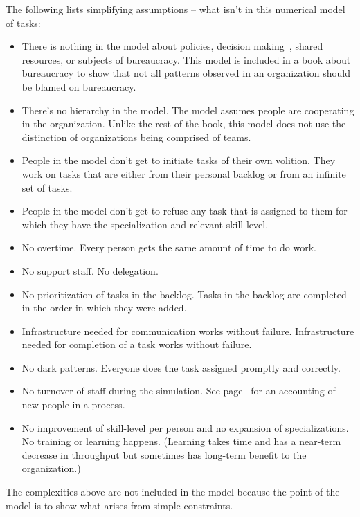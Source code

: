 The following lists simplifying assumptions -- what isn't in this numerical model of tasks:
\begin{itemize}
    \item There is nothing in the model about policies, decision making~\cite{2009_Klimek}, shared resources, or subjects of bureaucracy. This model is included in a book about bureaucracy to show that not all patterns observed in an organization should be blamed on bureaucracy. 
    \item There's no hierarchy in the model. The model assumes people are cooperating in the organization. Unlike the rest of the book, this model does not use the distinction of organizations being comprised of teams.
    \item People in the model don't get to initiate tasks of their own volition. They work on tasks that are either from their personal backlog or from an infinite set of tasks.
    \item People in the model don't get to refuse any task that is assigned to them for which they have the specialization and relevant skill-level.
    \item No overtime. Every person gets the same amount of time to do work.
    \item No support staff. No delegation. 
    \item No prioritization of tasks in the backlog. Tasks in the backlog are completed in the order in which they were added. 
    \item Infrastructure needed for communication works without failure. Infrastructure needed for completion of a task works without failure. 
    \item No dark patterns. Everyone does the task assigned promptly and correctly.
    \item No turnover of staff during the simulation. See page~\pageref{sec:new-person} for an accounting of new people in a process.
    \item No improvement of skill-level per person and no expansion of specializations. No training or learning happens. (Learning takes time and has a near-term decrease in throughput but sometimes has long-term benefit to the organization.)
\end{itemize}
The complexities above are not included in the model because the point of the model is to show what arises from simple constraints. 

